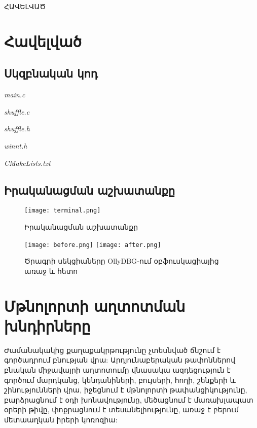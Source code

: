 \documentclass[12pt]{article}
\begin{document}
\begin{sloppypar}
\newpage
{}
\vspace*{\fill}
\begingroup
\centering
\centerline{\Huge{ՀԱՎԵԼՎԱԾ}}
\endgroup
\vspace*{\fill}
\newpage

\section*{Հավելված}
\subsection*{Սկզբնական կոդ}

\textit{main.c}

\textit{shuffle.c}

\textit{shuffle.h}

\textit{winnt.h}

\textit{CMakeLists.txt}


\newpage
\subsection*{Իրականացման աշխատանքը}

\begin{figure}[h!]
  \caption{Իրականացման աշխատանքը}
  \centering
    \texttt{[image: terminal.png]}
\end{figure}
\begin{figure}[h!]
  \caption{Ծրագրի սեկցիաները OllyDBG֊ում օբֆուսկացիայից առաջ և հետո}
  \centering
    \texttt{[image: before.png]}
    \texttt{[image: after.png]}
\end{figure}
\newpage
\lhead{}
\setcounter{page}{45}

\section*{Մթնոլորտի աղտոտման խնդիրները}
Ժամանակակից քաղաքակրթությունը չտեսնված ճնշում է գործադրում բնության վրա: Արդյունաբերական թափոններով բնական միջավայրի աղտոտումը վնասակա ազդեցություն է գործում մարդկանց, կենդանիների, բույսերի, հողի, շենքերի և շինությունների վրա, իջեցնում է մթնոլորտի թափանցիկությունը, բարձրացնում է օդի խոնավությունը, մեծացնում է մառախլապատ օրերի թիվը, փոքրացնում է տեսանելիությունը, առաջ է բերում մետաաղկան իրերի կոռոզիա:


\end{sloppypar}
\end{document}
